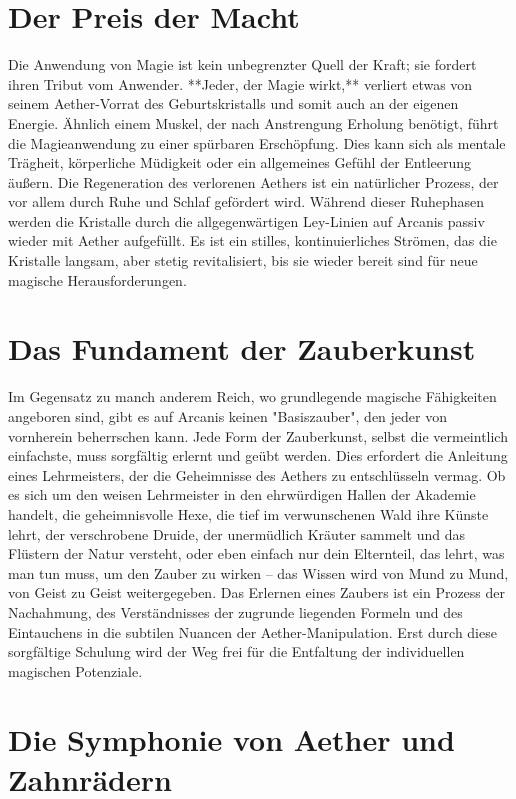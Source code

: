 \documentclass[10pt,a4paper,twocolumn,openany]{book}
\begin{document}
\section{Der Preis der Macht}

Die Anwendung von Magie ist kein unbegrenzter Quell der Kraft; sie fordert ihren Tribut vom Anwender. **Jeder, der Magie wirkt,** verliert etwas von seinem Aether-Vorrat des Geburtskristalls und somit auch an der eigenen Energie. Ähnlich einem Muskel, der nach Anstrengung Erholung benötigt, führt die Magieanwendung zu einer spürbaren Erschöpfung. Dies kann sich als mentale Trägheit, körperliche Müdigkeit oder ein allgemeines Gefühl der Entleerung äußern. Die Regeneration des verlorenen Aethers ist ein natürlicher Prozess, der vor allem durch Ruhe und Schlaf gefördert wird. Während dieser Ruhephasen werden die Kristalle durch die allgegenwärtigen Ley-Linien auf Arcanis passiv wieder mit Aether aufgefüllt. Es ist ein stilles, kontinuierliches Strömen, das die Kristalle langsam, aber stetig revitalisiert, bis sie wieder bereit sind für neue magische Herausforderungen.

\section{Das Fundament der Zauberkunst}

Im Gegensatz zu manch anderem Reich, wo grundlegende magische Fähigkeiten angeboren sind, gibt es auf Arcanis keinen "Basiszauber", den jeder von vornherein beherrschen kann. Jede Form der Zauberkunst, selbst die vermeintlich einfachste, muss sorgfältig erlernt und geübt werden. Dies erfordert die Anleitung eines Lehrmeisters, der die Geheimnisse des Aethers zu entschlüsseln vermag. Ob es sich um den weisen Lehrmeister in den ehrwürdigen Hallen der Akademie handelt, die geheimnisvolle Hexe, die tief im verwunschenen Wald ihre Künste lehrt, der verschrobene Druide, der unermüdlich Kräuter sammelt und das Flüstern der Natur versteht, oder eben einfach nur dein Elternteil, das lehrt, was man tun muss, um den Zauber zu wirken – das Wissen wird von Mund zu Mund, von Geist zu Geist weitergegeben. Das Erlernen eines Zaubers ist ein Prozess der Nachahmung, des Verständnisses der zugrunde liegenden Formeln und des Eintauchens in die subtilen Nuancen der Aether-Manipulation. Erst durch diese sorgfältige Schulung wird der Weg frei für die Entfaltung der individuellen magischen Potenziale.

\section{Die Symphonie von Aether und Zahnrädern}
\end{document}
